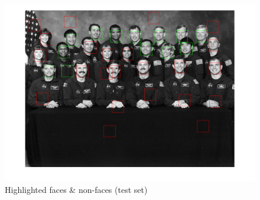 \begin{figure}[h!tb]
	\centering
		\includegraphics[width=\textwidth]{./img/ex1/testfaceshighlighted.png}
	\caption{Highlighted faces \& non-faces (test set)}
	\label{fig:testfaceshighlighted}
\end{figure}